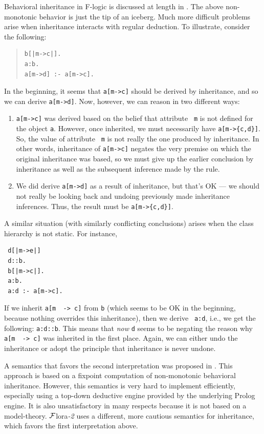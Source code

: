 \documentclass[11pt]{article}
\newcommand{\FLORA}{{\mbox{\sc ${\cal F}${lora}\rm\emph{-2}}}\xspace}
\newcommand{\FLSYSTEM}{\FLORA}
\newcommand{\mvd}{{\mbox{\tt \,->\,}}}  %
\newcommand{\fl}{\mbox{F-logic}\xspace}
\begin{document}
Behavioral inheritance in \fl is discussed at length in
\cite{inheritance-odbase-02,kifer-yang-inheritance-2006}.  The above  non-monotonic behavior is
just the tip of an iceberg. Much more difficult problems arise when
inheritance interacts with regular deduction. To illustrate, consider
the following:
\begin{quote}
\begin{verbatim}
b[|m->c|].
a:b.
a[m->d] :- a[m->c].
\end{verbatim}
\end{quote}
In the beginning, it seems that \verb|a[m->c]| should be derived by
inheritance, and so we can derive \verb|a[m->d]|. Now, however, we can
reason in two different ways:
\begin{enumerate}
\item \verb|a[m->c]| was derived based on the belief that attribute {\tt
    m} is not defined for the object {\tt a}. However, once inherited, we
  must necessarily have \verb|a[m->{c,d}]|. So, the value of attribute {\tt
    m} is not really the one produced by inheritance. In other words,
  inheritance of \verb|a[m->c]| negates the very premise on which the
  original inheritance was based, so we must give up the earlier conclusion
  by inheritance as well as the subsequent inference made by the rule.
\item We did derive \verb|a[m->d]| as a result of inheritance, but
  that's OK --- we should not really be looking back and undoing previously
  made inheritance inferences. Thus, the result must be \verb|a[m->{c,d}]|.
\end{enumerate}
A similar situation (with similarly conflicting conclusions) arises when
the class hierarchy is not static. For instance, 
\begin{verbatim}
 d[|m->e|]
 d::b.
 b[|m->c|].
 a:b.
 a:d :- a[m->c].  
\end{verbatim}
If we inherit {\tt a[m \mvd c]}  from {\tt b} (which seems to be OK in the
beginning, because nothing overrides this inheritance), then we derive {\tt
  a:d}, i.e., we get the following: {\tt a:d::b}. This means that
\emph{now} {\tt d} seems to be negating the reason why {\tt a[m \mvd c]} was
inherited in the first place. Again, we can either undo the inheritance or
adopt the principle that inheritance is never undone.

A semantics that favors the second interpretation was proposed in
\cite{KLW95}. This approach is based on a fixpoint computation of
non-monotonic behavioral inheritance.  However, this semantics is very hard
to implement efficiently, especially using a top-down deductive engine
provided by the underlying Prolog engine. It is also unsatisfactory in many
respects because it is not based on a model-theory. \FLSYSTEM uses a
different, more cautious semantics for inheritance, which favors the first
interpretation above.
\end{document}
